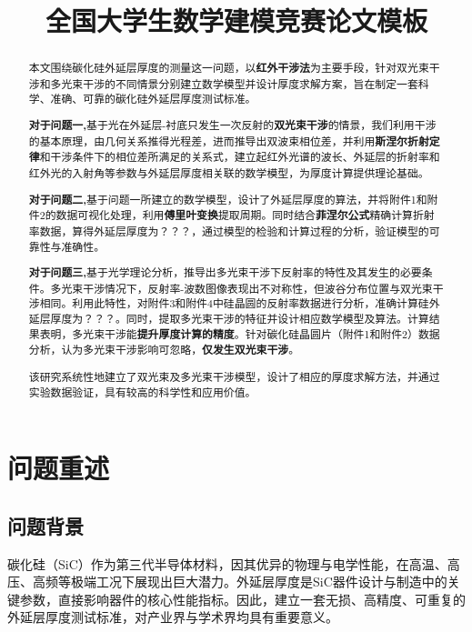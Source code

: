 \documentclass{cumcmthesis}
\title{全国大学生数学建模竞赛论文模板}  %
\begin{document}
\maketitle

\begin{abstract}
本文围绕碳化硅外延层厚度的测量这一问题，以\textbf{红外干涉法}为主要手段，针对双光束干涉和多光束干涉的不同情景分别建立数学模型并设计厚度求解方案，旨在制定一套科学、准确、可靠的碳化硅外延层厚度测试标准。


\textbf{对于问题一,}基于光在外延层-衬底只发生一次反射的\textbf{双光束干涉}的情景，我们利用干涉的基本原理，由几何关系推得光程差，进而推导出双波束相位差，并利用\textbf{斯涅尔折射定律}和干涉条件下的相位差所满足的关系式，建立起红外光谱的波长、外延层的折射率和红外光的入射角等参数与外延层厚度相关联的数学模型，为厚度计算提供理论基础。

\textbf{对于问题二,}基于问题一所建立的数学模型，设计了外延层厚度的算法，并将附件1和附件2的数据可视化处理，利用\textbf{傅里叶变换}提取周期。同时结合\textbf{菲涅尔公式}精确计算折射率数据，算得外延层厚度为？？？，通过模型的检验和计算过程的分析，验证模型的可靠性与准确性。

\textbf{对于问题三,}基于光学理论分析，推导出多光束干涉下反射率的特性及其发生的必要条件。多光束干涉情况下，反射率-波数图像表现出不对称性，但波谷分布位置与双光束干涉相同。利用此特性，对附件3和附件4中硅晶圆的反射率数据进行分析，准确计算硅外延层厚度为？？？。同时，提取多光束干涉的特征并设计相应数学模型及算法。计算结果表明，多光束干涉能\textbf{提升厚度计算的精度}。针对碳化硅晶圆片（附件1和附件2）数据分析，认为多光束干涉影响可忽略，\textbf{仅发生双光束干涉}。

该研究系统性地建立了双光束及多光束干涉模型，设计了相应的厚度求解方法，并通过实验数据验证，具有较高的科学性和应用价值。


\end{abstract}

\section{问题重述}
\subsection{问题背景}
碳化硅（SiC）作为第三代半导体材料，因其优异的物理与电学性能，在高温、高压、高频等极端工况下展现出巨大潜力。外延层厚度是SiC器件设计与制造中的关键参数，直接影响器件的核心性能指标。因此，建立一套无损、高精度、可重复的外延层厚度测试标准，对产业界与学术界均具有重要意义。
\end{document}
